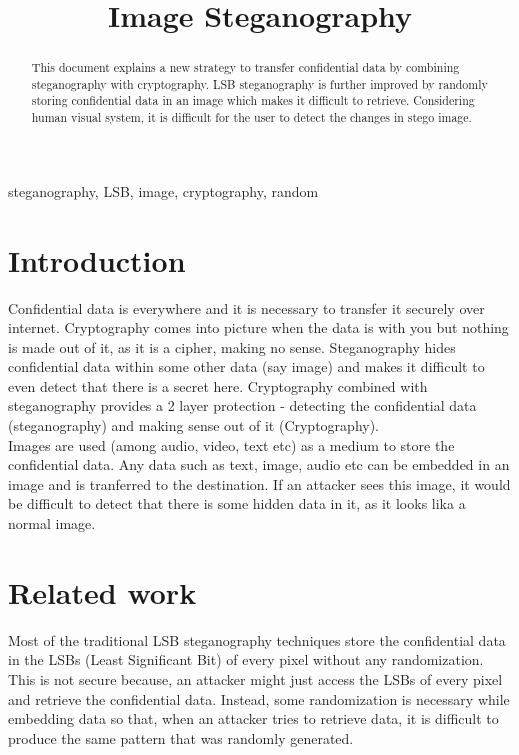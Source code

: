 \documentclass[conference]{IEEEtran}
\begin{document}
\title{Image Steganography\\
}

\author{
}

\maketitle

\begin{abstract}
This document explains a new strategy to transfer confidential data by combining steganography with cryptography.
LSB steganography is further improved by randomly storing confidential data in an image which makes it difficult to retrieve.
Considering human visual system, it is difficult for the user to detect the changes in stego image. \\
\end{abstract} 

\begin{IEEEkeywords}
steganography, LSB, image, cryptography, random
\end{IEEEkeywords}

\section{Introduction}
Confidential data is everywhere and it is necessary to transfer it securely over internet.
Cryptography comes into picture when the data is with you but nothing is made out of it, as it is a cipher, making no sense.
Steganography hides confidential data within some other data (say image) and makes it difficult to even detect that there is a secret here.
Cryptography combined with steganography provides a 2 layer protection - detecting the confidential data (steganography) and making sense out of it (Cryptography).\\

Images are used (among audio, video, text etc) as a medium to store the confidential data.
Any data such as text, image, audio etc can be embedded in an image and is tranferred to the destination.
If an attacker sees this image, it would be difficult to detect that there is some hidden data in it, as it looks lika a normal image.\\

\section{Related work}
Most of the traditional LSB steganography techniques store the confidential data in the LSBs (Least Significant Bit) of every pixel without any randomization. 
This is not secure because, an attacker might just access the LSBs of every pixel and retrieve the confidential data. 
Instead, some randomization is necessary while embedding data so that, when an attacker tries to retrieve data, it is difficult to produce the same pattern that was randomly generated.\\
\end{document}
